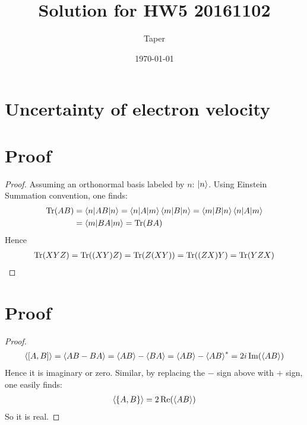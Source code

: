 \documentclass{article}
\title{Solution for HW5 20161102}
\date{\today}
\author{Taper}
\begin{document}
\maketitle
{}
\section{Uncertainty of electron velocity}
\section{Proof}
\begin{proof}
Assuming an orthonormal basis labeled by $n$: $\ket{n}$. Using
Einstein Summation convention, one finds:
\begin{align*}
    \operatorname{Tr}(AB) &= \braket{n|AB|n} = \braket{n|A|m}\braket{m|B|n}
      = \braket{m|B|n}\braket{n|A|m} \\
      &= \braket{m|BA|m} = \operatorname{Tr}(BA)
\end{align*}
Hence
\begin{align*}
    \operatorname{Tr}(XYZ) = \operatorname{Tr}( (XY) Z) = \operatorname{Tr}(Z (XY)) = \operatorname{Tr}( (ZX) Y) = \operatorname{Tr}(YZX)
\end{align*}
\end{proof}

\section{Proof}
\begin{proof}
\begin{align*}
    \braket{[A,B]} = \braket{ AB-BA} = \braket{AB} - \braket{BA} =
    \braket{AB}-\braket{AB}^* = 2i \Im(\braket{AB})
\end{align*}
Hence it is imaginary or zero. Similar, by replacing the $-$ sign
above with $+$ sign, one easily finds:
\begin{align*}
    \braket{\{A,B\}} = 2\Re(\braket{AB})
\end{align*}
So it is real.
\end{proof}
\end{document}
